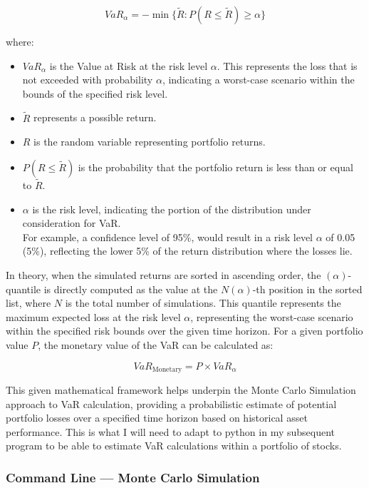 \documentclass{article}
\begin{document}
\begin{equation}
  VaR_\alpha = -\min \{\tilde{R} : P(R \leq \tilde{R}) \geq \alpha\}
\end{equation}

where:
\begin{itemize}
  \item \(VaR_\alpha\) is the Value at Risk at the risk level \(\alpha\). This represents the loss that is not exceeded with probability \(\alpha\), indicating a worst-case scenario within the bounds of the specified risk level.
  \item \(\tilde{R}\) represents a possible return.
  \item \(R\) is the random variable representing portfolio returns.
  \item \(P(R \leq \tilde{R})\) is the probability that the portfolio return is less than or equal to \(\tilde{R}\).
  \item \(\alpha\) is the risk level, indicating the portion of the distribution under consideration for VaR. \\For example, a confidence level of 95\%, would result in a risk level \(\alpha\) of 0.05 (5\%), reflecting the lower 5\% of the return distribution where the losses lie.
\end{itemize}

In theory, when the simulated returns are sorted in ascending order, the \((\alpha)\)-quantile is directly computed as the value at the \(N(\alpha)\)-th position in the sorted list, where \(N\) is the total number of simulations. This quantile represents the maximum expected loss at the risk level \(\alpha\), representing the worst-case scenario within the specified risk bounds over the given time horizon. For a given portfolio value \(P\), the monetary value of the VaR can be calculated as:

\begin{equation}
    VaR_{\text{Monetary}} = P \times VaR_\alpha
\end{equation}

This given mathematical framework helps underpin the Monte Carlo Simulation approach to VaR calculation, providing a probabilistic estimate of potential portfolio losses over a specified time horizon based on historical asset performance. This is what I will need to adapt to python in my subsequent program to be able to estimate VaR calculations within a portfolio of stocks.

\subsubsection{Command Line --- Monte Carlo Simulation}
\end{document}
